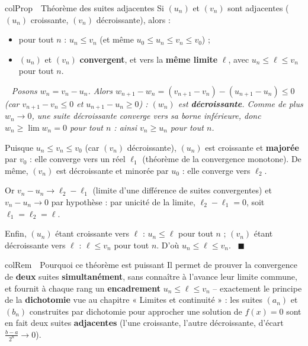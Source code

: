 \documentclass[11pt,a4paper]{article}
\newenvironment{propriete}[1][Propriété]
  {\begin{fiche}{colProp}{\ding{72}~~#1}}{\end{fiche}}
\newenvironment{remarque}[1][Remarque]
  {\begin{fiche}{colRem}{\ding{43}~~#1}}{\end{fiche}}
\newenvironment{demo}
  {\par\smallskip\noindent{\sffamily\bfseries\color{qtealdark}Démonstration.}\ \itshape}
  {\ \normalfont\hfill$\blacksquare$\par\medskip}
\begin{document}
\begin{propriete}[Théorème des suites adjacentes]
Si $(u_n)$ et $(v_n)$ sont adjacentes ($(u_n)$ croissante, $(v_n)$ décroissante), alors :
\begin{itemize}[leftmargin=6mm, itemsep=0.5mm]
  \item pour tout $n$ : $u_n\leq v_n$ (et même $u_0\leq u_n\leq v_n\leq v_0$) ;
  \item $(u_n)$ et $(v_n)$ \textbf{convergent}, et vers la \textbf{même limite} $\ell$, avec $u_n\leq\ell\leq v_n$ pour tout $n$.
\end{itemize}
\end{propriete}

\begin{demo}
Posons $w_n=v_n-u_n$. Alors $w_{n+1}-w_n=(v_{n+1}-v_n)-(u_{n+1}-u_n)\leq0$ (car $v_{n+1}-v_n\leq0$ et $u_{n+1}-u_n\geq0$) : $(w_n)$ est \textbf{décroissante}. Comme de plus $w_n\to0$, une suite décroissante converge vers sa borne inférieure, donc $w_n\geq\lim w_n=0$ pour tout $n$ : ainsi $v_n\geq u_n$ pour tout $n$.

\smallskip
Puisque $u_n\leq v_n\leq v_0$ (car $(v_n)$ décroissante), $(u_n)$ est croissante et \textbf{majorée} par $v_0$ : elle converge vers un réel $\ell_1$ (théorème de la convergence monotone). De même, $(v_n)$ est décroissante et minorée par $u_0$ : elle converge vers $\ell_2$.

\smallskip
Or $v_n-u_n\to\ell_2-\ell_1$ (limite d'une différence de suites convergentes) et $v_n-u_n\to0$ par hypothèse : par unicité de la limite, $\ell_2-\ell_1=0$, soit $\ell_1=\ell_2=\ell$.

\smallskip
Enfin, $(u_n)$ étant croissante vers $\ell$ : $u_n\leq\ell$ pour tout $n$ ; $(v_n)$ étant décroissante vers $\ell$ : $\ell\leq v_n$ pour tout $n$. D'où $u_n\leq\ell\leq v_n$.
\end{demo}

\begin{remarque}[Pourquoi ce théorème est puissant]
Il permet de prouver la convergence de \textbf{deux} suites \textbf{simultanément}, sans connaître à l'avance leur limite commune, et fournit à chaque rang un \textbf{encadrement} $u_n\leq\ell\leq v_n$ -- exactement le principe de la \textbf{dichotomie} vue au chapitre « Limites et continuité » : les suites $(a_n)$ et $(b_n)$ construites par dichotomie pour approcher une solution de $f(x)=0$ sont en fait deux suites \textbf{adjacentes} (l'une croissante, l'autre décroissante, d'écart $\frac{b-a}{2^n}\to0$).
\end{remarque}
\end{document}

